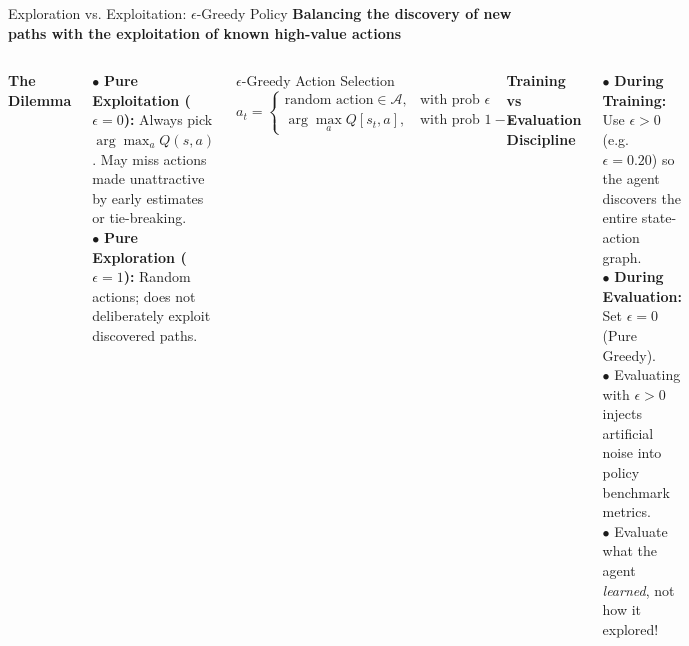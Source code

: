 \documentclass[aspectratio=169,10pt]{beamer}
\newcommand{\sectionlabel}[1]{%
  {\small\bfseries\color{islteal}#1}\par\vspace{0.14cm}%
}
\begin{document}
\begin{frame}{Exploration vs. Exploitation: $\epsilon$-Greedy Policy}
  \sectionlabel{Balancing the discovery of new paths with the exploitation of known high-value actions}

  \begin{columns}[T,onlytextwidth]
      {\small\bfseries\color{islteal} The Dilemma}\par\vspace{0.08cm}
      {\footnotesize
      $\bullet$ \textbf{Pure Exploitation ($\epsilon=0$):} Always pick $\arg\max_a Q(s, a)$. May miss actions made unattractive by early estimates or tie-breaking.\\[2pt]
      $\bullet$ \textbf{Pure Exploration ($\epsilon=1$):} Random actions; does not deliberately exploit discovered paths.\\[3pt]}
      \begin{block}{\footnotesize $\epsilon$-Greedy Action Selection}
        $$a_t = \begin{cases} \text{random action} \in \mathcal{A}, & \text{with prob } \epsilon \\ \arg\max_a Q[s_t, a], & \text{with prob } 1 - \epsilon \end{cases}$$
      \end{block}

      {\small\bfseries\color{islnavy} Training vs Evaluation Discipline}\par\vspace{0.08cm}
      {\footnotesize
      $\bullet$ \textbf{During Training:} Use $\epsilon > 0$ (e.g. $\epsilon = 0.20$) so the agent discovers the entire state-action graph.\\[2pt]
      $\bullet$ \textbf{During Evaluation:} Set $\epsilon = 0$ (Pure Greedy).\\[2pt]
      $\bullet$ Evaluating with $\epsilon > 0$ injects artificial noise into policy benchmark metrics.\\[2pt]
      $\bullet$ Evaluate what the agent \textit{learned}, not how it explored!}
  \end{columns}
\end{frame}
\end{document}

